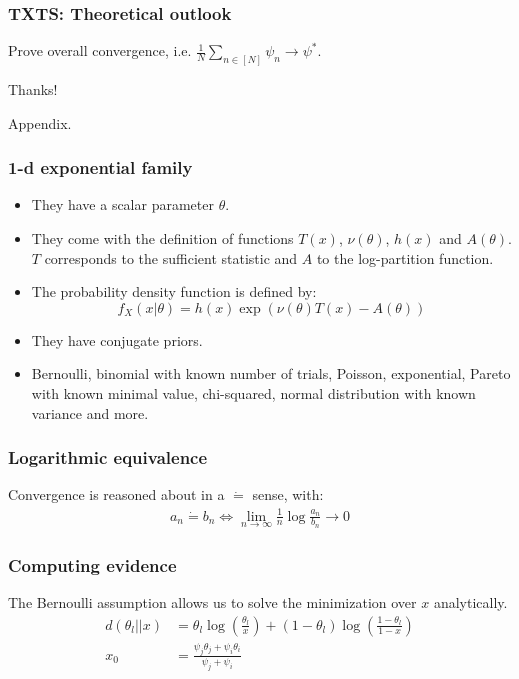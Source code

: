 \documentclass[aspectratio=43]{beamer}
\newcommand{\deq}{\dot{=}}
\begin{document}
\begin{frame}
\frametitle{TXTS: Theoretical outlook}
Prove overall convergence, i.e. $\frac{1}{N}\sum_{n \in [N]} \psi_n \rightarrow \psi^*$.
\end{frame}

\begin{frame}
Thanks!
\end{frame}

\appendix

\begin{frame}
Appendix.
\end{frame}

\begin{frame}
\frametitle{1-d exponential family}
\begin{itemize}
  \item They have a scalar parameter $\theta$.
  \item They come with the definition of functions $T(x)$, $\nu(\theta)$, $h(x)$ and $A(\theta)$. $T$ corresponds to the sufficient statistic and $A$ to the log-partition function.
  \item The probability density function is defined by:
    \[f_X(x|\theta) = h(x) \exp(\nu(\theta) T(x) - A(\theta))\]
  \item They have conjugate priors.
  \item Bernoulli, binomial with known number of trials, Poisson,
      exponential, Pareto with known minimal value, chi-squared, normal
      distribution with known variance and more.
\end{itemize}
\end{frame}

\begin{frame}
\frametitle{Logarithmic equivalence}
Convergence is reasoned about in a $\deq$ sense, with:
\begin{align}
  a_n \deq b_n \Leftrightarrow \lim_{n \rightarrow
  \infty}\frac{1}{n}\log{\frac{a_n}{b_n}} \rightarrow 0
\end{align}
\end{frame}

\begin{frame}
\frametitle{Computing evidence}
The Bernoulli assumption allows us to solve the minimization over $x$ analytically.
\begin{align}
  d(\theta_l||x) &= \theta_l \log(\frac{\theta_l}{x}) + (1-\theta_l) \log(\frac{1-\theta_l}{1-x}) \label{eq:bernoulli_kl} \\
  x_0 &= \frac{\psi_j\theta_j + \psi_i\theta_i}{\psi_j + \psi_i}
\end{align}
\end{frame}
\end{document}
